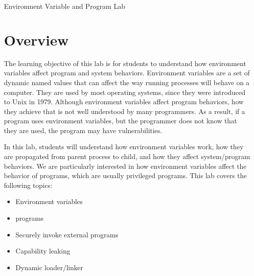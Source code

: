 
\newcommand{\commonfolder}{../../common-files}










\begin{center}
{\LARGE Environment Variable and \setuid Program Lab}
\end{center}



\section{Overview}

The learning objective of this lab is for students to understand how
environment variables affect program and system behaviors. Environment
variables are a set of dynamic named values that can affect the way running processes
will behave on a computer. They are used by most operating systems, since
they were introduced to Unix in 1979. Although environment variables affect
program behaviors, how they achieve that is not well understood by many
programmers. As a result, if a program uses  environment
variables,  but the programmer does not know that they are used, the program
may have vulnerabilities. 

In this lab, students will understand how
environment variables work, how they are propagated from parent process to
child, and how they affect system/program behaviors. We are particularly
interested in how environment variables affect the behavior of \setuid
programs, which are usually privileged programs.  
This lab covers the following topics:

\begin{itemize}[noitemsep]
\item Environment variables
\item \setuid programs
\item Securely invoke external programs
\item Capability leaking
\item Dynamic loader/linker
\end{itemize}


